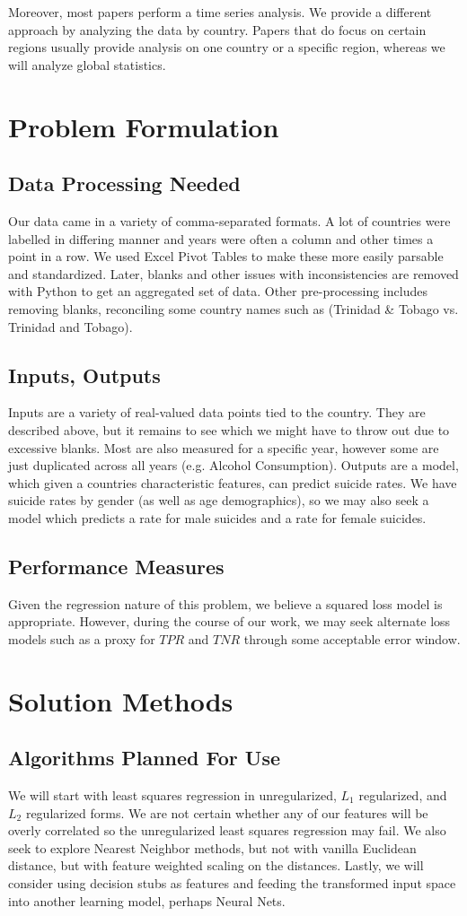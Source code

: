 \documentclass{article}
\begin{document}
\begin{multicols}{2}
Moreover, most papers perform a time series analysis. We provide a different approach by analyzing the data by country. Papers that do focus on certain regions usually provide analysis on one country or a specific region, whereas we will analyze global statistics. 


\section{Problem Formulation} 
\subsection{Data Processing Needed} Our data came in a variety of comma-separated formats. A lot of countries were labelled in differing manner and years were often a column and other times a point in a row. We used Excel Pivot Tables to make these more easily parsable and standardized. Later, blanks and other issues with inconsistencies are removed with Python to get an aggregated set of data. Other pre-processing includes removing blanks, reconciling some country names such as (Trinidad \& Tobago vs. Trinidad and Tobago).
\subsection{Inputs, Outputs} Inputs are a variety of real-valued data points tied to the country. They are described above, but it remains to see which we might have to throw out due to excessive blanks. Most are also measured for a specific year, however some are just duplicated across all years (e.g. Alcohol Consumption). Outputs are a model, which given a countries characteristic features, can predict suicide rates. We have suicide rates by gender (as well as age demographics), so we may also seek a model which predicts a rate for male suicides and a rate for female suicides.
\subsection{Performance Measures} Given the regression nature of this problem, we believe a squared loss model is appropriate. However, during the course of our work, we may seek alternate loss models such as a proxy for $TPR$ and $TNR$ through some acceptable error window.


\section{Solution Methods}
\subsection{Algorithms Planned For Use} We will start with least squares regression in unregularized, $L_1$ regularized, and $L_2$ regularized forms. We are not certain whether any of our features will be overly correlated so the unregularized least squares regression may fail. We also seek to explore Nearest Neighbor methods, but not with vanilla Euclidean distance, but with feature weighted scaling on the distances. Lastly, we will consider using decision stubs as features and feeding the transformed input space into another learning model, perhaps Neural Nets.

\end{multicols}
\end{document}
